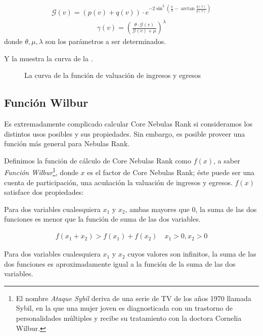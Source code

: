 \begin{align}
\mathcal{G}(v) = (p(v) + q(v)) \cdot e^{-2\sin^2{(\frac{\pi}{4} - \arctan\frac{q(v)}{p(v)})}}
\end{align}
\begin{align}
\gamma(v) = (\frac{\theta\cdot \mathcal{G}(v)}{\mathcal{G}(v) + \mu})^{\lambda}
\end{align}
\noindent donde $\theta, \mu, \lambda$ son los parámetros a ser determinados.


Y la  muestra la curva de la .
\begin{figure}
  \centering
  
\caption{La curva de la función de valuación de ingresos y egresos \label{fig-surf}}
\end{figure}

\subsection{Función Wilbur \label{sec:function}}
Es extremadamente complicado calcular Core Nebulas Rank si consideramos los distintos usos posibles y sus propiedades. Sin embargo, es posible proveer una función más general para Nebulas Rank.

Definimos la función de cálculo de Core Nebulas Rank como \(f(x)\), a saber \emph{Función Wilbur}\footnote{El nombre \emph{Ataque Sybil} deriva de una serie de TV de los años 1970 llamada Sybil, en la que una mujer joven es diagnosticada con un trastorno de personalidades múltiples y recibe su tratamiento con la doctora Cornelia Wilbur.}, donde \(x\) es el factor de Core Nebulas Rank; éste puede ser una cuenta de participación, una acuñación la valuación de ingresos y egresos. $f(x)$ satisface dos propiedades:

\begin{property}
\label{prop:one}
Para dos variables cualesquiera $x_1$ y $x_2$, ambas mayores que $0$, la suma de las dos funciones es menor que la función de suma de las dos variables.
\end{property}

\begin{align}
f(x_1+x_2)>f(x_1)+f(x_2) \quad x_1>0,x_2>0
\end{align}

\begin{property}
\label{prop:two}
Para dos variables cualesquiera $x_1$ y $x_2$ cuyos valores son infinitos, la suma de las dos funciones es aproximadamente igual a la función de la suma de las dos variables.
\end{property}


